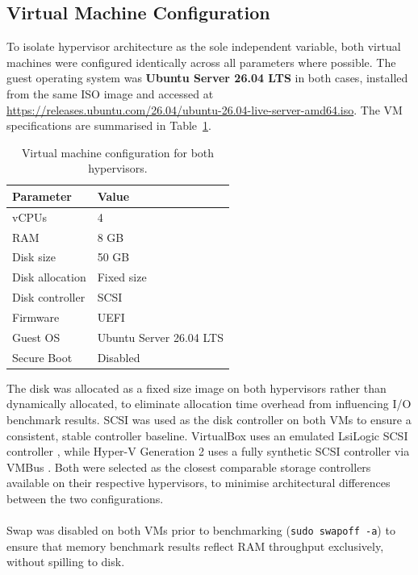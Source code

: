 \documentclass[a4paper, 12pt]{article}
\theoremstyle{plain}
\theoremstyle{definition}
\theoremstyle{remark}
\begin{document}
    \subsection{Virtual Machine Configuration}

    To isolate hypervisor architecture as the sole independent variable, both
    virtual machines were configured identically across all parameters where possible. The
    guest operating system was \textbf{Ubuntu Server 26.04 LTS} in both cases,
    installed from the same ISO image and accessed at \url{https://releases.ubuntu.com/26.04/ubuntu-26.04-live-server-amd64.iso}. The VM specifications are summarised in
    Table~\ref{tab:vmspecs}.

    \begin{table}[H]
    \centering
    \caption{Virtual machine configuration for both hypervisors.}
    \label{tab:vmspecs}
    \begin{tabular}{ll}
    \hline
    \textbf{Parameter} & \textbf{Value} \\
    \hline
    vCPUs            & 4 \\
    RAM              & 8 GB \\
    Disk size        & 50 GB \\
    Disk allocation  & Fixed size \\
    Disk controller  & SCSI \\
    Firmware         & UEFI \\
    Guest OS         & Ubuntu Server 26.04 LTS \\
    Secure Boot      & Disabled \\
    \hline
    \end{tabular}
    \end{table}

    \noindent The disk was allocated as a fixed size image on both hypervisors rather than
    dynamically allocated, to eliminate allocation time overhead from
    influencing I/O benchmark results. SCSI was used as the disk controller
    on both VMs to ensure a consistent, stable controller baseline. VirtualBox uses 
    an emulated LsiLogic SCSI controller \parencite{Chapter5Virtual}, 
    while Hyper-V Generation 2 uses a fully synthetic SCSI controller via VMBus 
    \parencite{johnHowardHyperVGeneration2}. Both were selected as the closest comparable 
    storage controllers available on their respective hypervisors, to minimise architectural 
    differences between the two configurations.\\
    \\
    \noindent Swap was disabled on both VMs prior to benchmarking (\texttt{sudo swapoff
    -a}) to ensure that memory benchmark results reflect RAM throughput
    exclusively, without spilling to disk.
\end{document}
